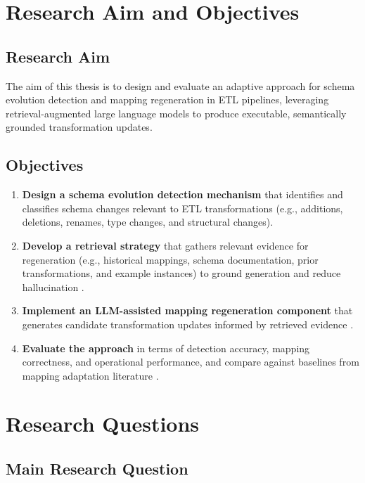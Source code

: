 \section{Research Aim and Objectives}
\label{sec:intro-aim}

\subsection{Research Aim}

The aim of this thesis is to design and evaluate an adaptive approach for schema evolution detection and mapping regeneration in ETL pipelines, leveraging retrieval-augmented large language models to produce executable, semantically grounded transformation updates.

\subsection{Objectives}

\begin{enumerate}
  \item \textbf{Design a schema evolution detection mechanism} that identifies and classifies schema changes relevant to ETL transformations (e.g., additions, deletions, renames, type changes, and structural changes).
  \item \textbf{Develop a retrieval strategy} that gathers relevant evidence for regeneration (e.g., historical mappings, schema documentation, prior transformations, and example instances) to ground generation and reduce hallucination \cite{lewis2020retrieval}.
  \item \textbf{Implement an LLM-assisted mapping regeneration component} that generates candidate transformation updates informed by retrieved evidence \cite{chen2021evaluating}.
  \item \textbf{Evaluate the approach} in terms of detection accuracy, mapping correctness, and operational performance, and compare against baselines from mapping adaptation literature \cite{velegrakis2003mapping,yu2005semantic}.
\end{enumerate}

\section{Research Questions}
\label{sec:intro-rq}

\subsection{Main Research Question}

